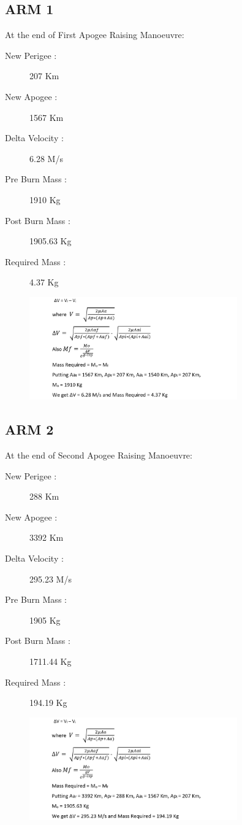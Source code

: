 \documentclass[11pt,fleqn]{book} %
\begin{document}
\subsection{ARM 1}

At the end of First Apogee Raising Manoeuvre:
\begin{description}
\item[New Perigee :] 207 Km
\item[New Apogee :] 1567 Km
\item[Delta Velocity :] 6.28 M/s
\item[Pre Burn Mass :] 1910 Kg
\item[Post Burn Mass :] 1905.63 Kg
\item[Required Mass :] 4.37 Kg
\end{description}

\begin{figure}[h]
    \includegraphics[width=0.8\textwidth]{ARM1.png}
\end{figure}

\subsection{ARM 2}

At the end of Second Apogee Raising Manoeuvre:
\begin{description}
\item[New Perigee :] 288 Km
\item[New Apogee :] 3392 Km
\item[Delta Velocity :] 295.23 M/s
\item[Pre Burn Mass :] 1905 Kg
\item[Post Burn Mass :] 1711.44 Kg
\item[Required Mass :] 194.19 Kg
\end{description}

\begin{figure}[h]
    \includegraphics[width=0.8\textwidth]{ARM2.png}
\end{figure}
\clearpage
\end{document}
